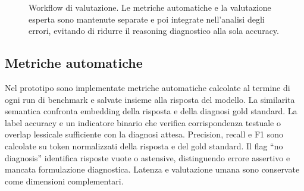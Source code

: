 \documentclass[11pt,a4paper]{article}
\begin{document}
\begin{figure}[htbp]
\centering
{}
\caption{Workflow di valutazione. Le metriche automatiche e la valutazione esperta sono mantenute separate e poi integrate nell'analisi degli errori, evitando di ridurre il reasoning diagnostico alla sola accuracy.}
\label{fig:evaluation-workflow-it}
\end{figure}

\subsection{Metriche automatiche}
Nel prototipo sono implementate metriche automatiche calcolate al termine di ogni run di benchmark e salvate insieme alla risposta del modello. La similarita semantica confronta embedding della risposta e della diagnosi gold standard. La label accuracy e un indicatore binario che verifica corrispondenza testuale o overlap lessicale sufficiente con la diagnosi attesa. Precision, recall e F1 sono calcolate su token normalizzati della risposta e del gold standard. Il flag ``no diagnosis'' identifica risposte vuote o astensive, distinguendo errore assertivo e mancata formulazione diagnostica. Latenza e valutazione umana sono conservate come dimensioni complementari.
\end{document}
